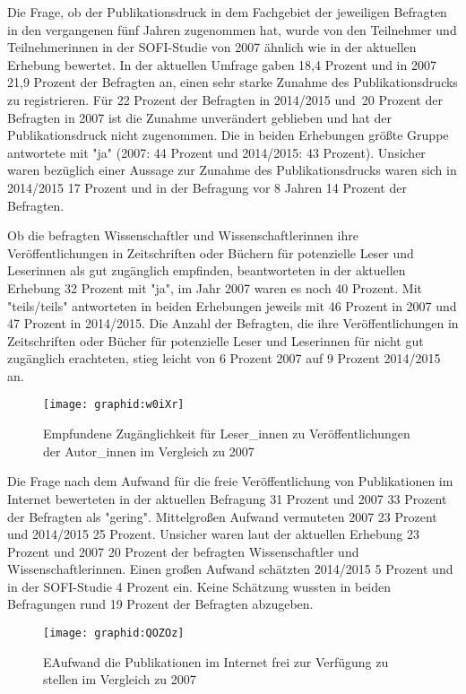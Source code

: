 Die Frage, ob der Publikationsdruck in dem Fachgebiet der jeweiligen Befragten in den vergangenen fünf Jahren zugenommen hat, wurde von den Teilnehmer und Teilnehmerinnen in der SOFI-Studie von 2007 ähnlich wie in der aktuellen Erhebung bewertet. In der aktuellen Umfrage gaben 18,4 Prozent und in 2007 21,9 Prozent der Befragten an, einen sehr starke Zunahme des Publikationsdrucks zu registrieren. Für 22 Prozent der Befragten in 2014/2015 und 20 Prozent der Befragten in 2007 ist die Zunahme unverändert geblieben und hat der Publikationsdruck nicht zugenommen. Die in beiden Erhebungen größte Gruppe antwortete mit "ja" (2007: 44 Prozent und 2014/2015: 43 Prozent). Unsicher waren bezüglich einer Aussage zur Zunahme des Publikationsdrucks waren sich in 2014/2015 17 Prozent und in der Befragung vor 8 Jahren 14 Prozent der Befragten.

Ob die befragten Wissenschaftler und Wissenschaftlerinnen ihre Veröffentlichungen in Zeitschriften oder Büchern für potenzielle Leser und Leserinnen als gut zugänglich empfinden, beantworteten in der aktuellen Erhebung 32 Prozent mit "ja", im Jahr 2007 waren es noch 40 Prozent. Mit "teils/teils" antworteten in beiden Erhebungen jeweils mit 46 Prozent in 2007 und 47 Prozent in 2014/2015. Die Anzahl der Befragten, die ihre Veröffentlichungen in Zeitschriften oder Bücher für potenzielle Leser und Leserinnen für nicht gut zugänglich erachteten, stieg leicht von 6 Prozent 2007 auf 9 Prozent 2014/2015 an.

\begin{figure}[h!]
\texttt{[image: graphid:w0iXr]}
\caption{Empfundene Zugänglichkeit für Leser_innen zu Veröffentlichungen der Autor_innen im Vergleich zu 2007}
\end{figure}

Die Frage nach dem Aufwand für die freie Veröffentlichung von Publikationen im Internet bewerteten in der aktuellen Befragung 31 Prozent und 2007 33 Prozent der Befragten als "gering". Mittelgroßen Aufwand vermuteten 2007 23 Prozent und 2014/2015 25 Prozent. Unsicher waren laut der aktuellen Erhebung 23 Prozent und 2007 20 Prozent der befragten Wissenschaftler und Wissenschaftlerinnen. Einen großen Aufwand schätzten 2014/2015 5 Prozent und in der SOFI-Studie 4 Prozent ein. Keine Schätzung wussten in beiden Befragungen rund 19 Prozent der Befragten abzugeben.

\begin{figure}[h!]
\texttt{[image: graphid:QOZOz]}
\caption{EAufwand die Publikationen im Internet frei zur Verfügung zu stellen im Vergleich zu 2007}
\end{figure}

